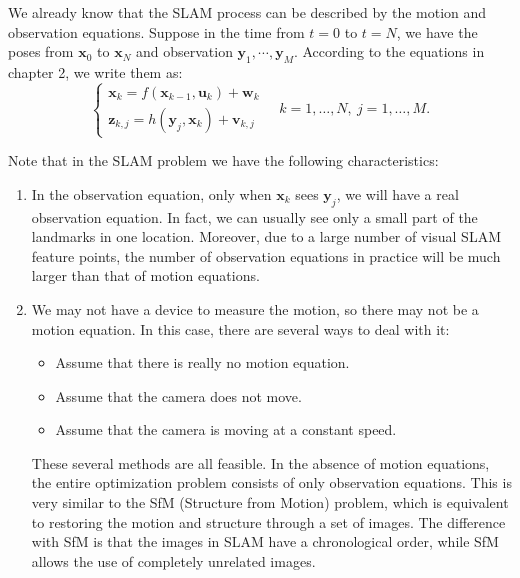 We already know that the SLAM process can be described by the motion and observation equations. Suppose in the time from $t=0$ to $t=N$, we have the poses from $\mathbf{x}_0$ to $\mathbf{x}_N$ and observation $\mathbf{y}_1, \cdots, \mathbf{y}_M$. According to the equations in chapter 2, we write them as: 
\begin{equation}
	\left\{ \begin{array}{l}
		{\mathbf{x}_k} = f\left( {{\mathbf{x}_{k - 1}},{\mathbf{u}_k}} \right) + \mathbf{w}_k \\
		{\mathbf{z}_{k,j}} = h\left( {{ \mathbf{y}_j},{ \mathbf{x}_k}}  \right)+ \mathbf{v}_{k,j}
	\end{array} \right. \quad k=1, \ldots, N, \  j=1, \ldots, M.
\end{equation}

Note that in the SLAM problem we have the following characteristics:
\begin{enumerate}
	\item In the observation equation, only when $\mathbf{x}_k$ sees $\mathbf{y}_j$, we will have a real observation equation. In fact, we can usually see only a small part of the landmarks in one location. Moreover, due to a large number of visual SLAM feature points, the number of observation equations in practice will be much larger than that of motion equations.
	\item We may not have a device to measure the motion, so there may not be a motion equation. In this case, there are several ways to deal with it:
	\begin{itemize}
		\item Assume that there is really no motion equation.
		\item Assume that the camera does not move.
		\item Assume that the camera is moving at a constant speed.
	\end{itemize}
	These several methods are all feasible. In the absence of motion equations, the entire optimization problem consists of only observation equations. This is very similar to the SfM (Structure from Motion) problem, which is equivalent to restoring the motion and structure through a set of images. The difference with SfM is that the images in SLAM have a chronological order, while SfM allows the use of completely unrelated images.
\end{enumerate} 

